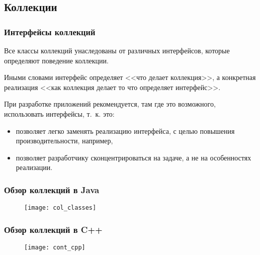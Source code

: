 \documentclass[default]{beamer}
\begin{document}
	\subsection{Коллекции}
	\begin{frame}
		\frametitle{Интерфейсы коллекций}
		
		Все классы коллекций унаследованы от различных интерфейсов, которые определяют поведение коллекции.
		
		Иными словами интерфейс определяет <<что делает коллекция>>, а конкретная реализация <<как коллекция делает то что определяет интерфейс>>.
		
		При разработке приложений рекомендуется, там где это возможного, использовать интерфейсы, т.~к. это:
		\begin{itemize}
			\item позволяет легко заменять реализацию интерфейса, с целью повышения производительности, например,
			\item позволяет разработчику сконцентрироваться на задаче, а не на особенностях реализации.
		\end{itemize}
	\end{frame}

	\begin{frame}
		\frametitle{Обзор коллекций в Java}
		
		\begin{figure}
			\texttt{[image: col\_classes]}
		\end{figure}
	\end{frame}

	\begin{frame}
		\frametitle{Обзор коллекций в C++}
		
		\begin{figure}
			\texttt{[image: cont\_cpp]}
		\end{figure}
	\end{frame}
	
\end{document}
